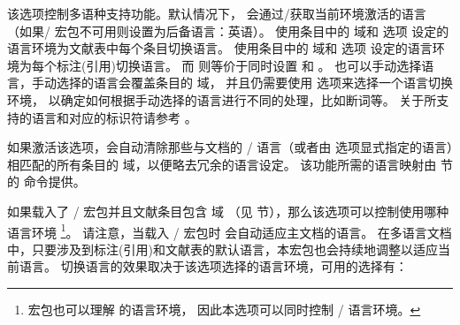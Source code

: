 \begin{optionlist}
该选项控制多语种支持功能。默认情况下，
\biblatex 会通过/获取当前环境激活的语言
（如果/ 宏包不可用则设置为后备语言：英语）。
 使用条目中的  域和  选项
设定的语言环境为文献表中每个条目切换语言。
 使用条目中的  域和  选项
设定的语言环境为每个标注(引用)切换语言。
而  则等价于同时设置  和  。
也可以手动选择语言，手动选择的语言会覆盖条目的  域，
并且仍需要使用  选项来选择一个语言切换环境，
以确定如何根据手动选择的语言进行不同的处理，比如断词等。
关于所支持的语言和对应的标识符请参考 。




如果激活该选项，\biblatex 会自动清除那些与文档的 / 语言（或者由  选项显式指定的语言）相匹配的所有条目的  域，以便略去冗余的语言设定。
该功能所需的语言映射由  节的  命令提供。


如果载入了 / 宏包并且文献条目包含  域
（见  节），那么该选项可以控制使用哪种  语言环境
\footnote{	 宏包也可以理解  的语言环境，	因此本选项可以同时控制 / 语言环境。}。
请注意，当载入 / 宏包时 \biblatex 会自动适应主文档的语言。
在多语言文档中，只要涉及到标注(引用)和文献表的默认语言，本宏包也会持续地调整以适应当前语言。
切换语言的效果取决于该选项选择的语言环境，可用的选择有：


\end{optionlist}
